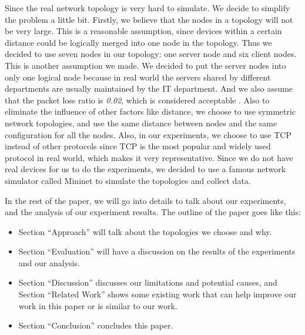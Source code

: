 Since the real network topology is very hard to simulate. 
We decide to simplify the problem a little bit. 
Firstly, we believe that the nodes in a topology will not be very large. 
This is a reasonable assumption, since devices within a certain distance 
could be logically merged into one node in the topology. 
Thus we decided to use seven nodes in our topology: 
one server node and six client nodes. This is another assumption we made. 
We decided to put the server nodes into only one logical node 
because in real world the servers shared by different departments are usually 
maintained by the IT department. And we also assume that 
the packet loss ratio is \textit{0.02}, which is considered acceptable \cite{PacketLoss:wiki}. 
Also to eliminate the influence of other factors like distance, 
we choose to use symmetric network topologies, 
and use the same distance between nodes and the same configuration for all the nodes.
Also, in our experiments, we choose to use TCP instead of other protocols since TCP is the most 
popular and widely used protocol in real world, which makes it very representative. Since we do not 
have real devices for us to do the experiments, we decided to use a famous network simulator called
Mininet \cite{Mininet:official} to simulate the topologies and collect data.

In the rest of the paper, we will go into details to talk about our experiments, and the analysis 
of our experiment results. The outline of the paper goes like this:
\begin{itemize}
    \item Section ``Approach'' will talk about the topologies we choose and why.
    \item Section ``Evaluation'' will have a discussion on the results of the experiments and our analysis.
	\item Section ``Discussion'' discusses our limitations and potential
	causes, and Section ``Related Work'' shows some existing work that 
	can help improve our work in this paper or is similar to our work.
    \item Section ``Conclusion'' concludes this paper.
\end{itemize}

